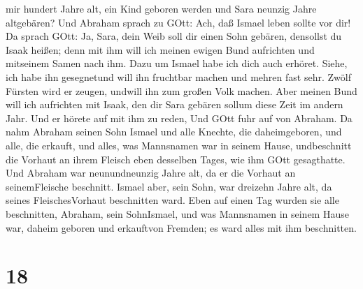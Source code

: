 mir hundert Jahre alt, ein Kind geboren werden und Sara neunzig Jahre
altgebären?  Und Abraham sprach zu GOtt: Ach, daß Ismael
leben sollte vor dir!  Da sprach GOtt: Ja, Sara, dein Weib
soll dir einen Sohn gebären, densollst du Isaak heißen; denn mit ihm
will ich meinen ewigen Bund aufrichten und mitseinem Samen nach ihm.
 Dazu um Ismael habe ich dich auch erhöret. Siehe, ich habe
ihn gesegnetund will ihn fruchtbar machen und mehren fast sehr. Zwölf
Fürsten wird er zeugen, undwill ihn zum großen Volk machen.
 Aber meinen Bund will ich aufrichten mit Isaak, den dir
Sara gebären sollum diese Zeit im andern Jahr.  Und er
hörete auf mit ihm zu reden, Und GOtt fuhr auf von Abraham.
 Da nahm Abraham seinen Sohn Ismael und alle Knechte, die
daheimgeboren, und alle, die erkauft, und alles, was Mannsnamen war in
seinem Hause, undbeschnitt die Vorhaut an ihrem Fleisch eben desselben
Tages, wie ihm GOtt gesagthatte.  Und Abraham war
neunundneunzig Jahre alt, da er die Vorhaut an seinemFleische beschnitt.
 Ismael aber, sein Sohn, war dreizehn Jahre alt, da seines
FleischesVorhaut beschnitten ward.  Eben auf einen Tag
wurden sie alle beschnitten, Abraham, sein SohnIsmael,  und
was Mannsnamen in seinem Hause war, daheim geboren und erkauftvon
Fremden; es ward alles mit ihm beschnitten.

\hypertarget{section-17}{%
\section{18}\label{section-17}}

